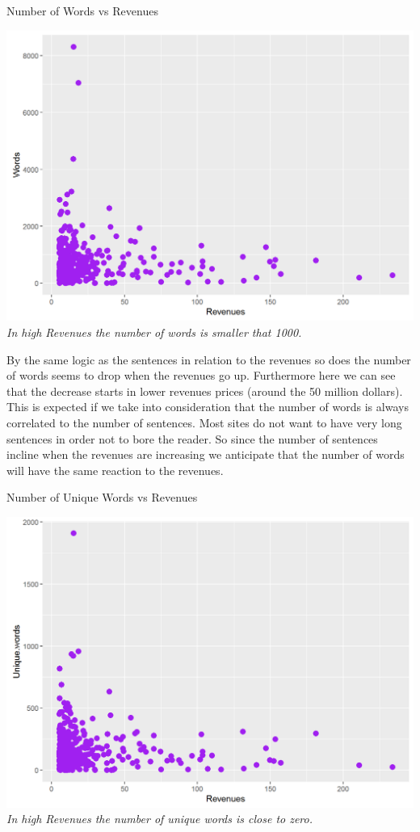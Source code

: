 \documentclass{book}
\begin{document}
\begin{table}[H]
\centering
\caption{Number of Words vs Revenues}
\begin{center}
\includegraphics[scale=0.4]{../R/photos/37_w_rev.png}   \\
\textit{In high Revenues the number of words is smaller that 1000.}
\end{center}
\end{table}
By the same logic as the sentences in relation to the revenues so does the number of words seems to drop when the revenues go up. Furthermore here we can see that the decrease starts in lower revenues prices (around the 50 million dollars). This is expected if we take into consideration that the number of words is always correlated to the number of sentences. Most sites do not want to have very long sentences in order not to bore the reader. So since the number of sentences incline when the revenues are increasing we anticipate that the number of words will have the same reaction to the revenues.
\begin{table}[H]
\centering
\caption{Number of Unique Words vs Revenues}
\begin{center}
\includegraphics[scale=0.4]{../R/photos/35_uw_rev.png}    \\
\textit{In high Revenues the number of unique words is close to zero.}
\end{center}
\end{table}
\end{document}
